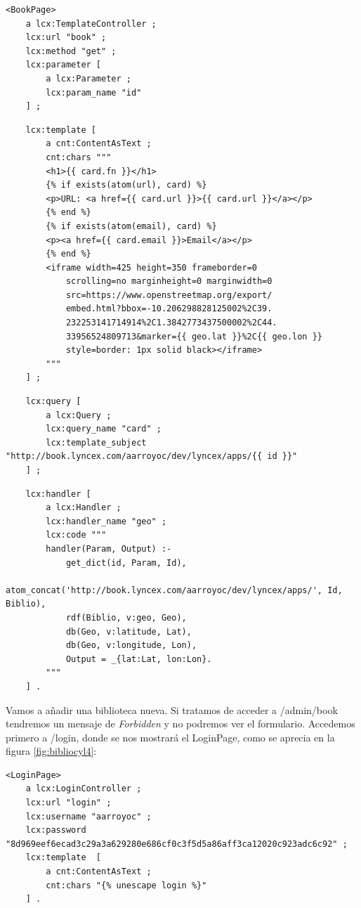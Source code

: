\documentclass[openright,twoside,12pt]{book}
\begin{document}
\begin{lstlisting}
<BookPage>
    a lcx:TemplateController ;
    lcx:url "book" ;
    lcx:method "get" ;
    lcx:parameter [
        a lcx:Parameter ;
        lcx:param_name "id"
    ] ;
\end{lstlisting}
\begin{lstlisting}
    lcx:template [
        a cnt:ContentAsText ;
        cnt:chars """
        <h1>{{ card.fn }}</h1>
        {% if exists(atom(url), card) %}
        <p>URL: <a href={{ card.url }}>{{ card.url }}</a></p>
        {% end %}
        {% if exists(atom(email), card) %}
        <p><a href={{ card.email }}>Email</a></p>
        {% end %}
        <iframe width=425 height=350 frameborder=0 
            scrolling=no marginheight=0 marginwidth=0 
            src=https://www.openstreetmap.org/export/
            embed.html?bbox=-10.206298828125002%2C39.
            232253141714914%2C1.3842773437500002%2C44.
            33956524809713&marker={{ geo.lat }}%2C{{ geo.lon }}
            style=border: 1px solid black></iframe>
        """
    ] ;
\end{lstlisting}
\begin{lstlisting}
    lcx:query [
        a lcx:Query ;
        lcx:query_name "card" ;
        lcx:template_subject "http://book.lyncex.com/aarroyoc/dev/lyncex/apps/{{ id }}"
    ] ;
\end{lstlisting}
\begin{lstlisting}
    lcx:handler [
        a lcx:Handler ;
        lcx:handler_name "geo" ;
        lcx:code """
        handler(Param, Output) :-
            get_dict(id, Param, Id),
            atom_concat('http://book.lyncex.com/aarroyoc/dev/lyncex/apps/', Id, Biblio),
            rdf(Biblio, v:geo, Geo),
            db(Geo, v:latitude, Lat),
            db(Geo, v:longitude, Lon),
            Output = _{lat:Lat, lon:Lon}.
        """
    ] .
\end{lstlisting}

Vamos a añadir una biblioteca nueva. Si tratamos de acceder a /admin/book tendremos un mensaje de \textit{Forbidden} y no podremos ver el formulario. Accedemos primero a /login, donde se nos mostrará el LoginPage, como se aprecia en la figura \ref{fig:bibliocyl4}:

\begin{lstlisting}
<LoginPage>
    a lcx:LoginController ;
    lcx:url "login" ;
    lcx:username "aarroyoc" ;
    lcx:password "8d969eef6ecad3c29a3a629280e686cf0c3f5d5a86aff3ca12020c923adc6c92" ;
    lcx:template  [
        a cnt:ContentAsText ;
        cnt:chars "{% unescape login %}"
    ] .
\end{lstlisting}
\end{document}
